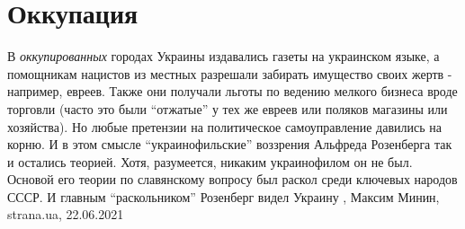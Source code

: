  
 
 
 
 
\chapter{Оккупация}
\label{sec:slova.okkupacia}

В \emph{оккупированных} городах Украины издавались газеты на украинском языке,
а помощникам нацистов из местных разрешали забирать имущество своих жертв -
например, евреев. Также они получали льготы по ведению мелкого бизнеса вроде
торговли (часто это были \enquote{отжатые} у тех же евреев или поляков магазины или
хозяйства).  Но любые претензии на политическое самоуправление давились на
корню. И в этом смысле \enquote{украинофильские} воззрения Альфреда Розенберга так и
остались теорией. Хотя, разумеется, никаким украинофилом он не был. Основой его
теории по славянскому вопросу был раскол среди ключевых народов СССР. И главным
\enquote{раскольником} Розенберг видел Украину 
  , Максим Минин, strana.ua, 22.06.2021
